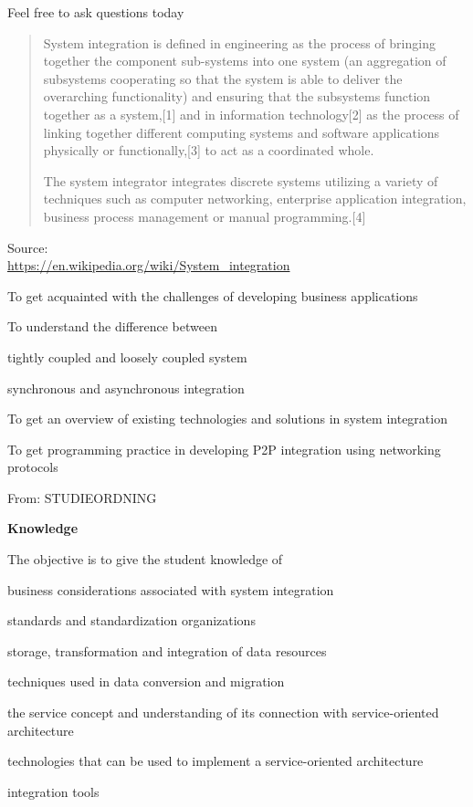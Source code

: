 \documentclass[Screen16to9,17pt]{foils}
\begin{document}
Feel free to ask questions today



\begin{quote}
  System integration is defined in engineering as the process of bringing together the component sub-systems into one system (an aggregation of subsystems cooperating so that the system is able to deliver the overarching functionality) and ensuring that the subsystems function together as a system,[1] and in information technology[2] as the process of linking together different computing systems and software applications physically or functionally,[3] to act as a coordinated whole.

  The system integrator integrates discrete systems utilizing a variety of techniques such as computer networking, enterprise application integration, business process management or manual programming.[4]
\end{quote}

Source:\\
\url{https://en.wikipedia.org/wiki/System_integration}




\begin{list1}
\item To get acquainted with the challenges of developing business applications
\item To understand the difference between
\begin{list2}
\item tightly coupled and loosely coupled system
\item synchronous and asynchronous integration
\end{list2}
\item To get an overview of existing technologies and solutions in system integration
\item To get programming practice in developing P2P integration using networking
protocols
\end{list1}


From: STUDIEORDNING

{\bf Knowledge}

The objective is to give the student knowledge of

\begin{list2}
\item business considerations associated with system integration
\item standards and standardization organizations
\item storage, transformation and integration of data resources
\item techniques used in data conversion and migration
\item the service concept and understanding of its connection with service-oriented architecture
\item technologies that can be used to implement a service-oriented architecture
\item integration tools
\end{list2}
\end{document}
